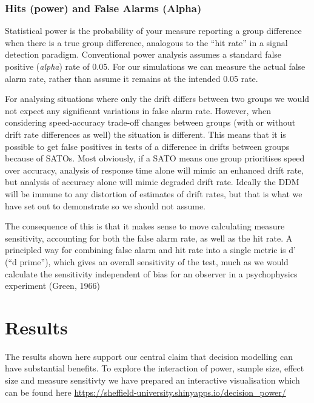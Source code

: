 \documentclass[floatsintext,doc]{apa6}
\theoremstyle{definition}
\theoremstyle{definition}
\theoremstyle{definition}
\theoremstyle{remark}
\begin{document}
\subsubsection{Hits (power) and False Alarms
(Alpha)}\label{hits-power-and-false-alarms-alpha}

Statistical power is the probability of your measure reporting a group
difference when there is a true group difference, analogous to the
\enquote{hit rate} in a signal detection paradigm. Conventional power
analysis assumes a standard false positive (\emph{alpha}) rate of 0.05.
For our simulations we can measure the actual false alarm rate, rather
than assume it remains at the intended 0.05 rate.

For analysing situations where only the drift differs between two groups
we would not expect any significant variations in false alarm rate.
However, when considering speed-accuracy trade-off changes between
groups (with or without drift rate differences as well) the situation is
different. This means that it is possible to get false positives in
tests of a difference in drifts between groups because of SATOs. Most
obviously, if a SATO means one group prioritises speed over accuracy,
analysis of response time alone will mimic an enhanced drift rate, but
analysis of accuracy alone will mimic degraded drift rate. Ideally the
DDM will be immune to any distortion of estimates of drift rates, but
that is what we have set out to demonstrate so we should not assume.

The consequence of this is that it makes sense to move calculating
measure sensitivity, accounting for both the false alarm rate, as well
as the hit rate. A principled way for combining false alarm and hit rate
into a single metric is d' (\enquote{d prime}), which gives an overall
sensitivity of the test, much as we would calculate the sensitivity
independent of bias for an observer in a psychophysics experiment
(Green, 1966)

\section{Results}\label{results}

The results shown here support our central claim that decision modelling
can have substantial benefits. To explore the interaction of power,
sample size, effect size and measure sensitivty we have prepared an
interactive visualisation which can be found here
\url{https://sheffield-university.shinyapps.io/decision_power/}
\end{document}
